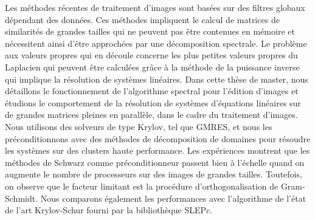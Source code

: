 Les méthodes récentes de traitement d'images sont basées sur des filtres globaux dépendant des données.
Ces méthodes impliquent le calcul de matrices de similarités de grandes tailles qui ne peuvent pas être contenues en mémoire et nécessitent ainsi d'être approchées par une décomposition spectrale.
Le problème aux valeurs propres qui en découle concerne les plus petites valeurs propres du Laplacien qui peuvent être calculées grâce à la méthode de la puissance inverse qui implique la résolution de systèmes linéaires.
Dans cette thèse de master, nous détaillons le fonctionnement de l'algorithme spectral pour l'édition d'images et étudions le comportement de la résolution de systèmes d'équations linéaires sur de grandes matrices pleines en parallèle, dans le cadre du traitement d'images.
Nous utilisons des solveurs de type Krylov, tel que GMRES, et nous les préconditionnons avec des méthodes de décomposition de domaines pour résoudre les systèmes sur des clusters haute performance.
Les expériences montrent que les méthodes de Schwarz comme préconditionneur passent bien à l'échelle quand on augmente le nombre de processeurs sur des images de grandes tailles.
Toutefois, on observe que le facteur limitant est la procédure d'orthogonalisation de Gram-Schmidt.
\ifthesis
 Nous comparons également les performances avec l'algorithme de l'état de l'art Krylov-Schur fourni par la bibliothèque SLEPc.
\fi
